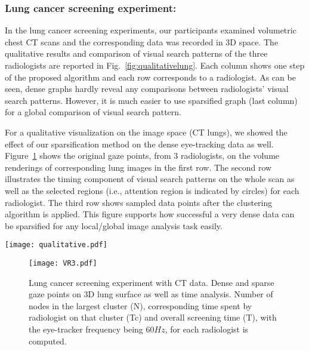 \documentclass[preprint,12pt]{elsarticle}
\begin{document}
\subsubsection{Lung cancer screening experiment:} In the lung cancer screening experiments, our participants examined volumetric chest CT scans and the corresponding data was recorded in 3D space. The qualitative results and comparison of visual search patterns of the three radiologists are reported in Fig.~\ref{fig:qualitativelung}. Each column shows one step of the proposed algorithm and each row corresponds to a radiologist. As can be seen, dense graphs hardly reveal any comparisons between radiologists' visual search patterns. However, it is much easier to use sparsified graph (last column) for a global comparison of visual search pattern. 

For a qualitative visualization on the image space (CT lungs), we showed the effect of our sparsification method on the dense eye-tracking data as well. Figure~\ref{fig:VRlung} shows the original gaze points, from $3$ radiologists, on the volume renderings of corresponding lung images in the first row. The second row illustrates the timing component of visual search patterns on the whole scan as well as the selected regions (i.e., attention region is indicated by circles) for each radiologist. The third row shows sampled data points after the clustering algorithm is applied. This figure supports how successful a very dense data can be sparsified for any local/global image analysis task easily.

\begin{figure*}
\centering
\texttt{[image: qualitative.pdf]}
\caption{Lung cancer screening experiments with CT data. First column: dense gaze patterns. Second column: attention based clustering. Third column: nodes in clusters are reduced. Fourth column: sparse graph after further reducing edges. \label{fig:qualitativelung}}
\end{figure*}
\begin{figure}[h]
\texttt{[image: VR3.pdf]}
\caption{Lung cancer screening experiment with CT data. Dense and sparse gaze points on 3D lung surface as well as time analysis. Number of nodes in the largest cluster (N), corresponding time spent by radiologist on that cluster (Tc) and overall screening time (T), with the eye-tracker frequency being $60Hz$, for each radiologist is computed. \label{fig:VRlung}}
\end{figure}
\end{document}
